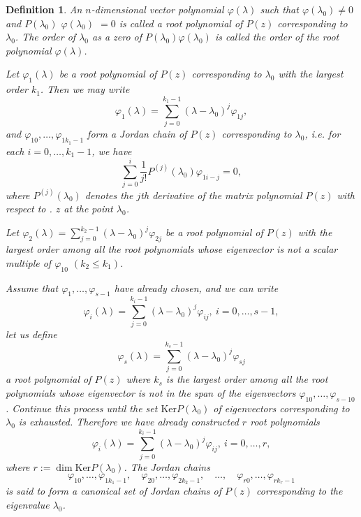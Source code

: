 \documentclass[10pt,reqno]{amsart}
\theoremstyle{break-italic}
\theoremstyle{break-italic}
\theoremstyle{break-italic}
\theoremstyle{break-italic}
\theoremstyle{break-italic}
\theoremstyle{break-italic}
\theoremstyle{break-italic}
\theoremstyle{break-italic}
\theoremstyle{break-roman}
\newtheorem{definition}[satz]{Definition}
\theoremstyle{standard}
\theoremstyle{varthm-roman}
\theoremstyle{varthm-italic}
\theoremstyle{varthm-roman-break}
\theoremstyle{varthm-italic-break}
\theoremstyle{varthm-roman-no-punctuation}
\theoremstyle{varthm-italic-no-punctuation}
\numberwithin{equation}{section}
\begin{document}
\begin{definition}\rm
An $n$-dimensional vector polynomial $\varphi(\lambda)$ such that $\varphi(\lambda_0)\not = 0$ and $P(\lambda_0)$ $\varphi(\lambda_0)$ $  =0$ is called a \emph{root polynomial } of $P(z)$ corresponding to $\lambda_0$. The order of $\lambda_0$ as a zero of
$P(\lambda_0)\varphi(\lambda_0)$ is called the \emph{order} of the root polynomial $\varphi(\lambda)$.

Let $\varphi_1 (\lambda)$ be a root polynomial of $P(z)$ corresponding to $\lambda_0$ with the largest order $k_1$.  Then we may write
$$ \varphi_1(\lambda)=\displaystyle\sum_{j=0}^{k_1-1} (\lambda - \lambda_0)^j \varphi_{1j},$$
and $\varphi_{10}, \ldots, \varphi_{1 k_1-1}$ form a \emph{Jordan chain} of $P(z)$ corresponding to $\lambda_0$, i.e. for each $i = 0, \ldots, k_1-1$, we have
$$ \sum_{j=0}^i \dfrac{1}{j!}P^{(j)}(\lambda_0)\varphi_{1 i-j}=0,$$
where $P^{(j)}(\lambda_0)$ denotes the $j$th derivative of the matrix polynomial $P(z)$ with respect to . $z$ at the point $\lambda_0$.



Let  $\varphi_2(\lambda)=\displaystyle\sum_{j=0}^{k_2-1} (\lambda - \lambda_0)^j \varphi_{2j}$ be a  root polynomial of $P(z)$   with the largest order among all the root polynomials whose eigenvector is not a scalar multiple of $\varphi_{10}$ $(k_2 \leq k_1)$.

Assume that $\varphi_1, \ldots, \varphi_{s-1}$ have already chosen, and we can  write
$$ \varphi_i(\lambda)= \displaystyle\sum_{j=0}^{k_i-1} (\lambda - \lambda_0)^j \varphi_{ij}, ~ i=0, \ldots, s-1,$$
let us define
$$ \varphi_s(\lambda)= \displaystyle\sum_{j=0}^{k_s-1} (\lambda - \lambda_0)^j \varphi_{sj} $$
a root polynomial of $P(z)$ where $k_s$ is the largest order among all the root polynomials whose eigenvector is not in the span of the eigenvectors $\varphi_{10}, \ldots,\varphi_{s-1 0}$. Continue this process until the set $\mbox{Ker} P(\lambda_0)$ of eigenvectors corresponding to $\lambda_0$ is exhausted. Therefore we have already constructed $r$ root polynomials
$$ \varphi_i(\lambda)= \displaystyle\sum_{j=0}^{k_i-1} (\lambda - \lambda_0)^j \varphi_{ij}, ~ i=0, \ldots, r,$$
where $r := \dim \mbox{Ker} P(\lambda_0)$. The Jordan chains
$$\varphi_{10}, \ldots, \varphi_{1 k_1-1}, \quad \varphi_{20}, \ldots, \varphi_{2 k_2-1}, \quad  \ldots, \quad \varphi_{r0}, \ldots, \varphi_{r k_r-1}  $$
is said to form  a \emph{canonical set of Jordan chains} of $P(z)$ corresponding to the eigenvalue $\lambda_0$.
\end{definition}
\end{document}
